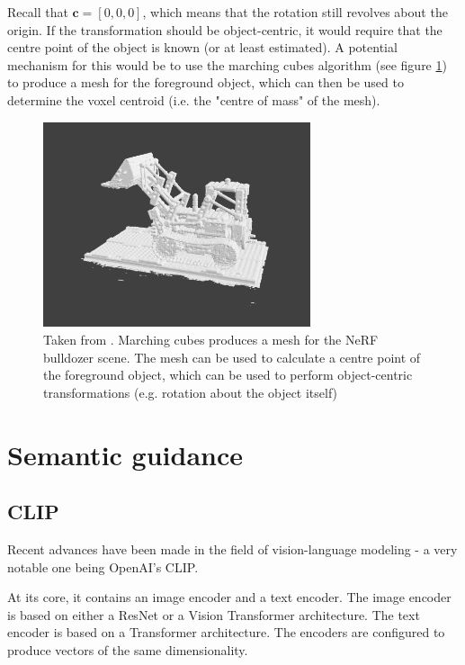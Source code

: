 Recall that $\textbf{c} = [0,0,0]$, which means that the rotation still revolves about the origin. If the transformation should be object-centric, it would require that the centre point of the object is known (or at least estimated). A potential mechanism for this would be to use the marching cubes algorithm (see figure \ref{fig:marching-cubes}) to produce a mesh for the foreground object, which can then be used to determine the voxel centroid (i.e. the "centre of mass" of the mesh).
\begin{figure}[H]
    \centering
    \includegraphics[width=0.7\textwidth]{figures/marching-cubes.png}
    \caption{Taken from \cite{nerf2020}. Marching cubes produces a mesh for the NeRF bulldozer scene. The mesh can be used to calculate a centre point of the foreground object, which can be used to perform object-centric transformations (e.g. rotation about the object itself)}
    \label{fig:marching-cubes}
\end{figure}

\section{Semantic guidance}
\subsection{CLIP}
Recent advances have been made in the field of vision-language modeling - a very notable one being OpenAI's CLIP\cite{radford2021}.

At its core, it contains an image encoder and a text encoder. The image encoder is based on either a ResNet\cite{resnet-paper} or a Vision Transformer\cite{vit-paper} architecture. The text encoder is based on a Transformer\cite{vaswani2017} architecture. The encoders are configured to produce vectors of the same dimensionality.

